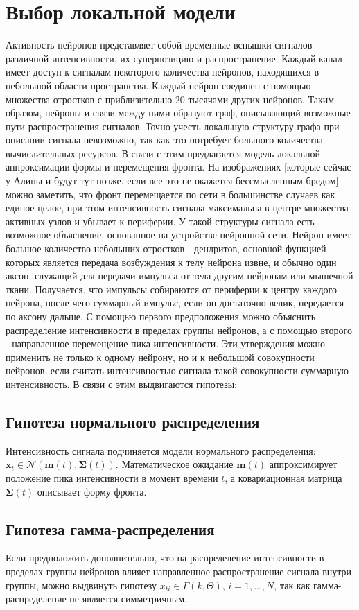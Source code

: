 \documentclass[12pt,twoside]{article}
\begin{document}
\section{Выбор локальной модели}
Активность нейронов представляет собой временные вспышки сигналов различной интенсивности, их суперпозицию и распространение. Каждый канал имеет доступ к сигналам некоторого количества нейронов, находящихся в небольшой области пространства. Каждый нейрон соединен с помощью множества отростков с приблизительно 20 тысячами других нейронов. Таким образом, нейроны и связи между ними образуют граф, описывающий возможные пути распространения сигналов. Точно учесть локальную структуру графа при описании сигнала невозможно, так как это потребует большого количества вычислительных ресурсов. В связи с этим предлагается модель локальной аппроксимации формы и перемещения фронта. На изображениях [которые сейчас у Алины и будут тут позже, если все это не окажется бессмысленным бредом] можно заметить, что фронт перемещается по сети в большинстве случаев как единое целое, при этом интенсивность сигнала максимальна в центре множества активных узлов и убывает к периферии. У такой структуры сигнала есть возможное объяснение, основанное на устройстве нейронной сети. Нейрон имеет большое количество небольших отростков - дендритов, основной функцией которых является передача возбуждения к телу нейрона извне, и обычно один аксон, служащий для передачи импульса от тела другим нейронам или мышечной ткани. Получается, что импульсы собираются от периферии к центру каждого нейрона, после чего суммарный импульс, если он достаточно велик, передается по аксону дальше. С помощью первого предположения можно объяснить распределение интенсивности в пределах группы нейронов, а с помощью второго - направленное перемещение пика интенсивности. Эти утверждения можно применить не только к одному нейрону, но и к небольшой совокупности нейронов, если считать интенсивностью сигнала такой совокупности суммарную интенсивность. В связи с этим выдвигаются гипотезы: 

\subsection{Гипотеза нормального распределения}
Интенсивность сигнала подчиняется модели нормального распределения: $\mathbf{x}_t \in \mathcal{N}(\mathbf{m}(t),\mathbf{\Sigma}(t))$. Математическое ожидание $\mathbf{m}(t)$ аппроксимирует положение пика интенсивности в момент времени $t$, а ковариационная матрица $\mathbf{\Sigma}(t)$ описывает форму фронта. 

\subsection{Гипотеза гамма-распределения}
Если предположить дополнительно, что на распределение интенсивности в пределах группы нейронов влияет направленное распространение сигнала внутри группы, можно выдвинуть гипотезу $x_{ti}
\in \Gamma(k, \Theta)$, $i=1,\dots,N$, так как гамма-распределение не является симметричным.


\end{document}
